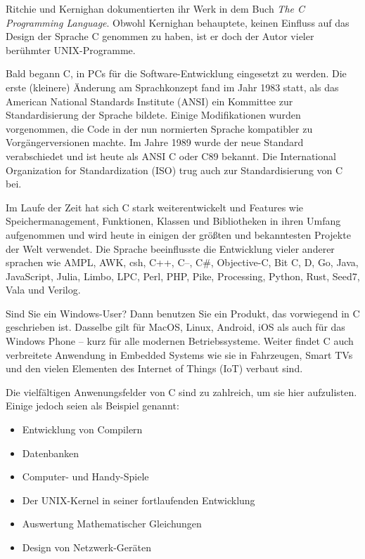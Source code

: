 \begin{appendices}
Ritchie und Kernighan dokumentierten ihr Werk in dem Buch \emph{The C Programming Language}. Obwohl Kernighan behauptete, keinen Einfluss auf das Design der Sprache C genommen zu haben, ist er doch der Autor vieler berühmter UNIX-Programme.

Bald begann C, in PCs für die Software-Entwicklung eingesetzt zu werden. Die erste (kleinere) Änderung am Sprachkonzept fand im Jahr 1983 statt, als das American National Standards Institute (ANSI) ein Kommittee zur Standardisierung der Sprache bildete. Einige Modifikationen wurden vorgenommen, die Code in der nun normierten Sprache kompatibler zu Vorgängerversionen machte. Im Jahre 1989 wurde der neue Standard verabschiedet und ist heute als ANSI C oder C89 bekannt. Die International Organization for Standardization (ISO) trug auch zur Standardisierung von C bei.

Im Laufe der Zeit hat sich C stark weiterentwickelt und Features wie Speichermanagement, Funktionen, Klassen und Bibliotheken in ihren Umfang aufgenommen und wird heute in einigen der größten und bekanntesten Projekte der Welt verwendet. Die Sprache beeinflusste die Entwicklung vieler anderer sprachen wie AMPL, AWK, csh, C++, C--, C\#, Objective-C, Bit C, D, Go, Java, JavaScript, Julia, Limbo, LPC, Perl, PHP, Pike, Processing, Python, Rust, Seed7, Vala und Verilog. 

Sind Sie ein Windows-User? Dann benutzen Sie ein Produkt, das vorwiegend in C geschrieben ist. Dasselbe gilt für MacOS, Linux, Android, iOS als auch für das Windows Phone -- kurz für alle modernen Betriebssysteme. Weiter findet C auch verbreitete Anwendung in Embedded Systems wie sie in Fahrzeugen, Smart TVs und den vielen Elementen des Internet of Things (IoT) verbaut sind.

Die vielfältigen Anwenungsfelder von C sind zu zahlreich, um sie hier aufzulisten. Einige jedoch seien als Beispiel genannt:
\begin{itemize}
\item Entwicklung von Compilern
\item Datenbanken 
\item Computer- und Handy-Spiele
\item Der UNIX-Kernel in seiner fortlaufenden Entwicklung
\item Auswertung Mathematischer Gleichungen
\item Design von Netzwerk-Geräten
\end{itemize}


\end{appendices}
